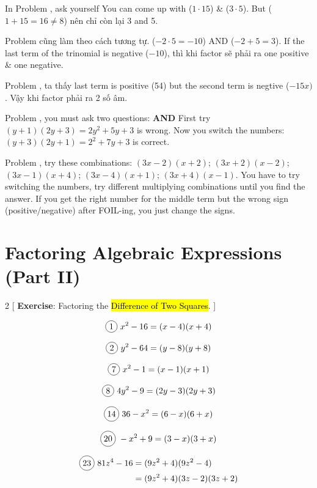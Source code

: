 In Problem , ask yourself  You can come up with ($1\cdot 15$) \& ($3\cdot 5$). But ($1+15=16 \neq 8$) nên chỉ còn lại 3 and 5.

Problem  cũng làm theo cách tương tự. ($-2\cdot 5=-10$) AND ($-2+5=3$). If the last term of the trinomial is negative ($-10$), thì khi factor sẽ phải ra one positive \& one negative.

Problem , ta thấy last term is positive (54) but the second term is negtive ($-15x)$. Vậy khi factor phải ra 2 số âm.

Problem , you must ask two questions:  \textbf{AND}  First try $(y+1)(2y+3)=2y^{2}+5y+3$ is wrong. Now you switch the numbers: $(y+3)(2y+1)=2^{2}+7y+3$ is correct.

Problem , try these combinations: $(3x-2)(x+2)$; $(3x+2)(x-2)$; $(3x-1)(x+4)$; $(3x-4)(x+1)$; $(3x+4)(x-1)$. You have to try switching the numbers, try different multiplying combinations until you find the answer. If you get the right number for the middle term but the wrong sign (positive/negative) after FOIL-ing, you just change the signs.

\section{Factoring Algebraic Expressions (Part II)}

\begin{multicols}{2}
[
  \textbf{Exercise}: Factoring the \hl{Difference of Two Squares}.
]

\begin{align*}
  \circled{1}\ x^{2}-16=(x-4)(x+4)
\end{align*}

  \[\circled{2}\ y^{2}-64=(y-8)(y+8)\]

  \[\circled{7}\ x^{2}-1=(x-1)(x+1)\]

  \[\circled{8}\ 4y^{2}-9=(2y-3)(2y+3)\]

  \[\circled{14}\ 36-x^{2}=(6-x)(6+x)\]

  \[\circled{20}\ -x^{2}+9=(3-x)(3+x)\]

\begin{align*}
  \circled{23}\ 81z^{4}-16&=(9z^{2}+4)(9z^{2}-4)\\
  &=(9z^{2}+4)(3z-2)(3z+2)
\end{align*}
\end{multicols}

